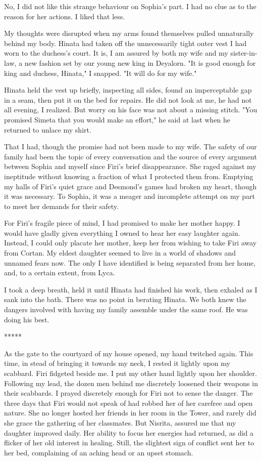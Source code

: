 \documentclass{article}
\begin{document}
No, I did not like this strange behaviour on Sophia's part. I had no clue as to the reason for her actions. I liked that less.

My thoughts were disrupted when my arms found themselves pulled unnaturally behind my body. Hinata had taken off the unnecessarily tight outer vest I had worn to the duchess's court. It is, I am assured by both my wife and my sister-in-law, a new fashion set by our young new king in Deyalorn. "It is good enough for king and duchess, Hinata," I snapped. "It will do for my wife."

Hinata held the vest up briefly, inspecting all sides, found an imperceptable gap in a seam, then put it on the bed for repairs. He did not look at me, he had not all evening, I realized. But worry on his face was not about a missing stitch. "You promised Simeta that you would make an effort," he said at last when he returned to unlace my shirt.

That I had, though the promise had not been made to my wife. The safety of our family had been the topic of every conversation and the source of every argument between Sophia and myself since Firi's brief disappearance. She raged against my ineptitude without knowing a fraction of what I protected them from. Emptying my halls of Firi's quiet grace and Desmond's games had broken my heart, though it was necessary. To Sophia, it was a meager and incomplete attempt on my part to meet her demands for their safety.

For Firi's fragile piece of mind, I had promised to make her mother happy. I would have gladly given everything I owned to hear her easy laughter again. Instead, I could only placate her mother, keep her from wishing to take Firi away from Cortan. My eldest daughter seemed to live in a world of shadows and unnamed fears now. The only I have identified is being separated from her home, and, to a certain extent, from Lyca.

I took a deep breath, held it until Hinata had finished his work, then exhaled as I sank into the bath. There was no point in berating Hinata. We both knew the dangers involved with having my family assemble under the same roof. He was doing his best.

*****

As the gate to the courtyard of my house opened, my hand twitched again. This time, in stead of bringing it towards my neck, I rested it lightly upon my scabbard. Firi fidgeted beside me. I put my other hand lightly upon her shoulder. Following my lead, the dozen men behind me discretely loosened their weapons in their scabbards. I prayed discretely enough for Firi not to sense the danger. The three days that Firi would not speak of had robbed her of her carefree and open nature. She no longer hosted her friends in her room in the Tower, and rarely did she grace the gathering of her classmates. But Nisrita, assured me that my daughter improved daily. Her ability to focus her energies had returned, as did a flicker of her old interest in healing. Still, the slightest sign of conflict sent her to her bed, complaining of an aching head or an upset stomach.
\end{document}
